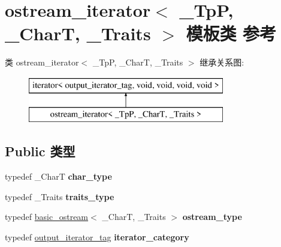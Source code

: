 \hypertarget{classostream__iterator}{}\section{ostream\+\_\+iterator$<$ \+\_\+\+TpP, \+\_\+\+CharT, \+\_\+\+Traits $>$ 模板类 参考}
\label{classostream__iterator}
类 ostream\+\_\+iterator$<$ \+\_\+\+TpP, \+\_\+\+CharT, \+\_\+\+Traits $>$ 继承关系图\+:\begin{figure}[H]
\begin{center}
\leavevmode
\includegraphics[height=2.000000cm]{classostream__iterator}
\end{center}
\end{figure}
\subsection*{Public 类型}
\begin{DoxyCompactItemize}
\item 
\mbox{\label{classostream__iterator_a97ffb0363c27776dc4dee1ca99588e1e}} 
typedef \+\_\+\+CharT {\bfseries char\+\_\+type}
\item 
\mbox{\label{classostream__iterator_a7199963df1f90db3bbe4ae02efee0f5c}} 
typedef \+\_\+\+Traits {\bfseries traits\+\_\+type}
\item 
\mbox{\label{classostream__iterator_a8aa958d786f117253610c3ca7bbfc0a3}} 
typedef \hyperlink{classbasic__ostream}{basic\+\_\+ostream}$<$ \+\_\+\+CharT, \+\_\+\+Traits $>$ {\bfseries ostream\+\_\+type}
\item 
\mbox{\label{classostream__iterator_afaba0c290dadc178221238e2c8c8ad77}} 
typedef \hyperlink{structoutput__iterator__tag}{output\+\_\+iterator\+\_\+tag} {\bfseries iterator\+\_\+category}
\end{DoxyCompactItemize}
